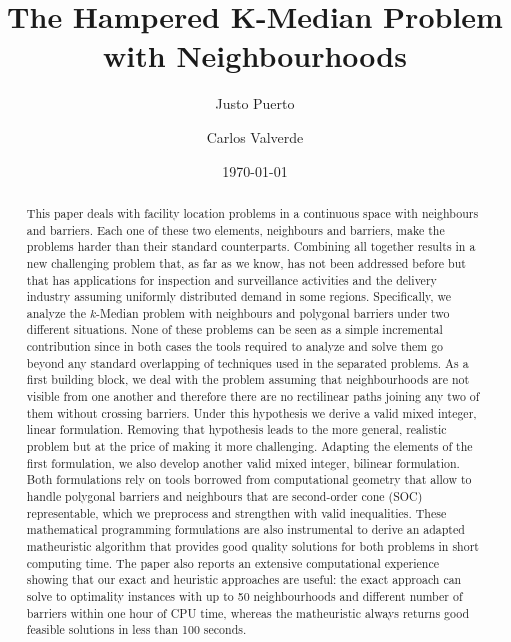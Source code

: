 \documentclass[a4paper,  review, authoryear, 1p.]{elsarticle}
\newcommand{\JP}[1]{{\color{armygreen}#1}}
\begin{document}
	
	\begin{frontmatter}
		
		\title{The Hampered K-Median Problem with Neighbourhoods}
		
		\author[1]{Justo Puerto}%
		\author[2]{Carlos Valverde}
		
		\address[1]{Institute of Mathematics (IMUS) and Department of Statistics and Operations Research, University of Seville, Seville, 41012, Spain}
		\address[2]{Institute of Mathematics (IMUS) and Department of Statistics and Operations Research, University of Seville, Seville, 41012, Spain}
		
		
		\date{\today}
		
		
		\begin{abstract}
			This paper deals with facility location  problems in a continuous space with neighbours and barriers. Each one of these two elements, neighbours and barriers, make the problems harder than their standard counterparts. Combining all together results in a new challenging problem  that, as far as we know, has not been addressed before but that has applications for inspection and surveillance activities and the delivery industry assuming uniformly distributed demand in some regions. Specifically, we analyze the $k$-Median  problem with neighbours and polygonal barriers under two different situations. \JP{None of these problems can be  seen as a simple incremental contribution since in both cases the tools required to analyze and solve them go beyond any standard overlapping of techniques used in the separated problems.} As a first building block, we deal with the problem assuming that neighbourhoods are not visible from one another and therefore there are no rectilinear paths joining any two of them without crossing barriers. Under this hypothesis we derive a valid mixed integer, linear formulation. Removing that hypothesis leads to the more general, realistic problem but at the price of making it more challenging. Adapting the elements of the first formulation, we also develop another valid mixed integer, bilinear formulation.  \JP{Both formulations rely on tools borrowed from computational geometry} that allow to handle polygonal barriers and neighbours that are second-order cone (SOC) representable, which we preprocess and strengthen with valid inequalities. These mathematical programming formulations are also instrumental to derive an adapted matheuristic algorithm that provides good quality solutions for both problems in short computing time. The paper also reports an extensive computational experience showing that our exact and heuristic approaches are useful: the exact approach can solve to optimality instances with up to 50 neighbourhoods and different number of barriers within one hour of CPU time, whereas the matheuristic always returns good feasible solutions in less than 100 seconds.
		\end{abstract}
		

\end{frontmatter}
\end{document}
